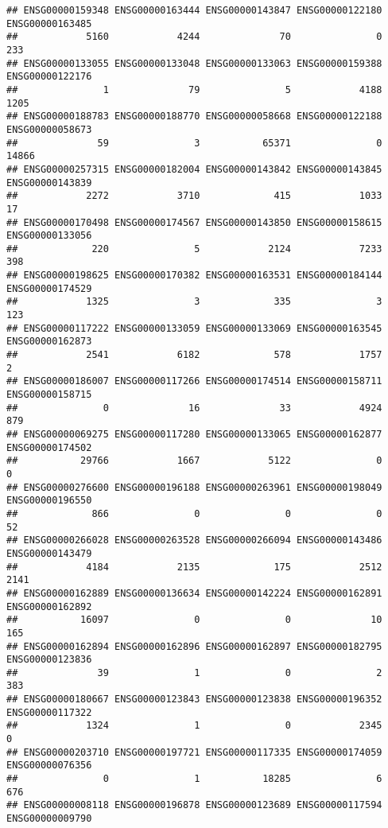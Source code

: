\documentclass[
]{article}
\begin{document}
\begin{verbatim}
## ENSG00000159348 ENSG00000163444 ENSG00000143847 ENSG00000122180 ENSG00000163485 
##            5160            4244              70               0             233 
## ENSG00000133055 ENSG00000133048 ENSG00000133063 ENSG00000159388 ENSG00000122176 
##               1              79               5            4188            1205 
## ENSG00000188783 ENSG00000188770 ENSG00000058668 ENSG00000122188 ENSG00000058673 
##              59               3           65371               0           14866 
## ENSG00000257315 ENSG00000182004 ENSG00000143842 ENSG00000143845 ENSG00000143839 
##            2272            3710             415            1033              17 
## ENSG00000170498 ENSG00000174567 ENSG00000143850 ENSG00000158615 ENSG00000133056 
##             220               5            2124            7233             398 
## ENSG00000198625 ENSG00000170382 ENSG00000163531 ENSG00000184144 ENSG00000174529 
##            1325               3             335               3             123 
## ENSG00000117222 ENSG00000133059 ENSG00000133069 ENSG00000163545 ENSG00000162873 
##            2541            6182             578            1757               2 
## ENSG00000186007 ENSG00000117266 ENSG00000174514 ENSG00000158711 ENSG00000158715 
##               0              16              33            4924             879 
## ENSG00000069275 ENSG00000117280 ENSG00000133065 ENSG00000162877 ENSG00000174502 
##           29766            1667            5122               0               0 
## ENSG00000276600 ENSG00000196188 ENSG00000263961 ENSG00000198049 ENSG00000196550 
##             866               0               0               0              52 
## ENSG00000266028 ENSG00000263528 ENSG00000266094 ENSG00000143486 ENSG00000143479 
##            4184            2135             175            2512            2141 
## ENSG00000162889 ENSG00000136634 ENSG00000142224 ENSG00000162891 ENSG00000162892 
##           16097               0               0              10             165 
## ENSG00000162894 ENSG00000162896 ENSG00000162897 ENSG00000182795 ENSG00000123836 
##              39               1               0               2             383 
## ENSG00000180667 ENSG00000123843 ENSG00000123838 ENSG00000196352 ENSG00000117322 
##            1324               1               0            2345               0 
## ENSG00000203710 ENSG00000197721 ENSG00000117335 ENSG00000174059 ENSG00000076356 
##               0               1           18285               6             676 
## ENSG00000008118 ENSG00000196878 ENSG00000123689 ENSG00000117594 ENSG00000009790 

\end{verbatim}
\end{document}
